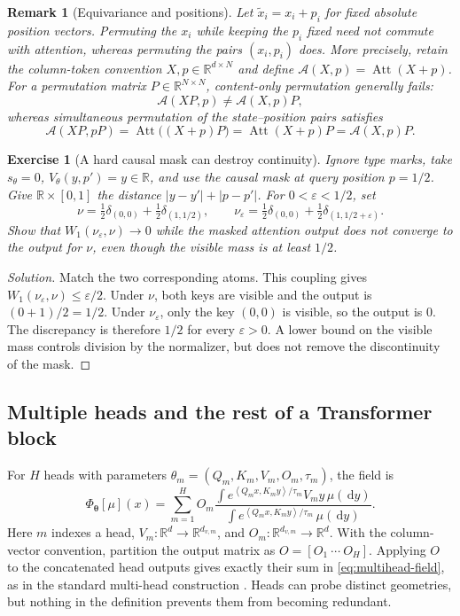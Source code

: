 \documentclass[11pt]{amsart}
\numberwithin{equation}{section}
\theoremstyle{plain}
\newtheorem{exercise}[theorem]{Exercise}
\newtheorem{remark}[theorem]{Remark}
\newcommand{\R}{\mathbb{R}}
\newcommand{\dd}{\,\mathrm{d}}
\newcommand{\abs}[1]{\left\lvert#1\right\rvert}
\newcommand{\ip}[2]{\left\langle#1,#2\right\rangle}
\begin{document}
\begin{remark}[Equivariance and positions]
Let $\widetilde x_i=x_i+p_i$ for fixed absolute position vectors.  Permuting
the $x_i$ while keeping the $p_i$ fixed need not commute with attention,
whereas permuting the pairs $(x_i,p_i)$ does.  More precisely, retain the
column-token convention $X,p\in\R^{d\times N}$ and define
$\mathcal A(X,p)=\operatorname{Att}(X+p)$.  For a permutation matrix
$P\in\R^{N\times N}$, content-only permutation generally fails:
\[
 \mathcal A(XP,p)\ne\mathcal A(X,p)P,
\]
whereas simultaneous permutation of the state--position pairs satisfies
\[
 \mathcal A(XP,pP)
 =\operatorname{Att}\bigl((X+p)P\bigr)
 =\operatorname{Att}(X+p)P
 =\mathcal A(X,p)P.
\]
\end{remark}

\begin{exercise}[A hard causal mask can destroy continuity]
Ignore type marks, take $s_\theta=0$, $V_\theta(y,p')=y\in\R$, and use the
causal mask at query position $p=1/2$.  Give $\R\times[0,1]$ the distance
$\abs{y-y'}+\abs{p-p'}$.  For $0<\varepsilon<1/2$, set
\[
 \nu=\tfrac12\delta_{(0,0)}+\tfrac12\delta_{(1,1/2)},\qquad
 \nu_\varepsilon
 =\tfrac12\delta_{(0,0)}+\tfrac12\delta_{(1,1/2+\varepsilon)}.
\]
Show that $W_1(\nu_\varepsilon,\nu)\to0$ while the masked attention output
does not converge to the output for $\nu$, even though the visible mass is
at least $1/2$.
\end{exercise}
\begin{proof}[Solution]
Match the two corresponding atoms.  This coupling gives
$W_1(\nu_\varepsilon,\nu)\leq\varepsilon/2$.  Under $\nu$, both keys are
visible and the output is $(0+1)/2=1/2$.  Under $\nu_\varepsilon$, only the
key $(0,0)$ is visible, so the output is $0$.  The discrepancy is therefore
$1/2$ for every $\varepsilon>0$.  A lower bound on the visible mass controls
division by the normalizer, but does not remove the discontinuity of the mask.
\end{proof}

\subsection{Multiple heads and the rest of a Transformer block}
For $H$ heads with parameters
$\theta_m=(Q_m,K_m,V_m,O_m,\tau_m)$, the field is
\begin{equation}\label{eq:multihead-field}
  \Phi_{\boldsymbol\theta}[\mu](x)
  =\sum_{m=1}^H O_m
   \frac{\int e^{\ip{Q_mx}{K_my}/\tau_m}V_my\,\mu(\dd y)}
        {\int e^{\ip{Q_mx}{K_my}/\tau_m}\,\mu(\dd y)}.
\end{equation}
Here $m$ indexes a head, $V_m:\R^d\to\R^{d_{v,m}}$, and
$O_m:\R^{d_{v,m}}\to\R^d$.  With the column-vector convention, partition
the output matrix as $O=[O_1\ \cdots\ O_H]$.  Applying $O$ to the
concatenated head outputs gives exactly their sum in
\eqref{eq:multihead-field}, as in the standard multi-head construction
\cite{VaswaniEtAl2017}.  Heads can probe distinct geometries, but nothing in
the definition prevents them from becoming redundant.
\end{document}

